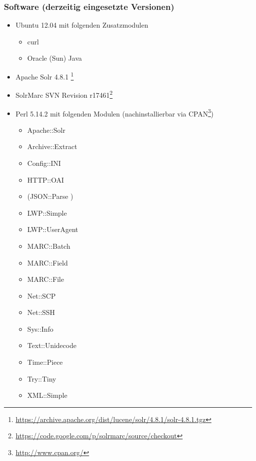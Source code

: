 \documentclass[10pt]{article}
\begin{document}
\subsubsection{Software (derzeitig eingesetzte Versionen)}
\label{sec:subsub:software}
\begin{itemize}
	\item Ubuntu 12.04 mit folgenden Zusatzmodulen
	\begin{itemize}
		\item curl
		\item Oracle (Sun) Java
	\end{itemize}
	\item Apache Solr 4.8.1 \footnote{\url{https://archive.apache.org/dist/lucene/solr/4.8.1/solr-4.8.1.tgz}}
	\item SolrMarc SVN Revision r17461\footnote{\url{https://code.google.com/p/solrmarc/source/checkout}}
	\item Perl 5.14.2 mit folgenden Modulen (nachinstallierbar via CPAN\footnote{\url{http://www.cpan.org/}})
	\begin{itemize}
		\item Apache::Solr %
		\item Archive::Extract	%
		\item Config::INI		%
		\item HTTP::OAI 		%
		\item (JSON::Parse )	%
		\item LWP::Simple 		%
		\item LWP::UserAgent 	%
		\item MARC::Batch 		%
		\item MARC::Field 		%
		\item MARC::File 		%
		\item Net::SCP 			%
		\item Net::SSH 			%
		\item Sys::Info 		%
		\item Text::Unidecode 	%
		\item Time::Piece 		%
		\item Try::Tiny 		%
		\item XML::Simple		%
	\end{itemize}
\end{itemize}
\end{document}
